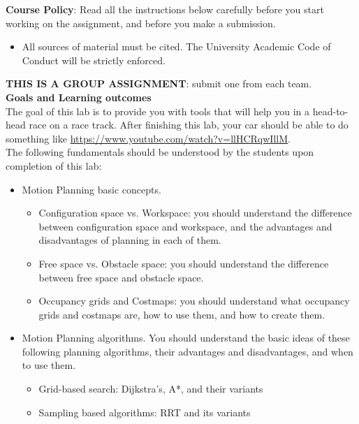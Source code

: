 \documentclass[letter]{article}
\begin{document}
\textbf{Course Policy}: Read all the instructions below carefully before you start working on the assignment, and before you make a submission.
\begin{itemize}
    \item All sources of material must be cited. The University Academic Code of Conduct
will be strictly enforced.
\end{itemize}
\textbf{THIS IS A GROUP ASSIGNMENT}: submit one from each team.\\

\textbf{Goals and Learning outcomes}\\
The goal of this lab is to provide you with tools that will help you in a head-to-head race on a race track. After finishing this lab, your car should be able to do something like \href{https://www.youtube.com/watch?v=llHCRqwIllM}{https://www.youtube.com/watch?v=llHCRqwIllM}.\\
The following fundamentals should be understood by the students upon completion of this lab:
\begin{itemize}
    \item Motion Planning basic concepts.
    \begin{itemize}
        \item Configuration space vs. Workspace: you should understand the difference between configuration space and workspace, and the advantages and disadvantages of planning in each of them.
        \item Free space vs. Obstacle space: you should understand the difference between free space and obstacle space.
        \item Occupancy grids and Costmaps: you should understand what occupancy grids and costmaps are, how to use them, and how to create them.
    \end{itemize}
    
    \item Motion Planning algorithms. You should understand the basic ideas of these following planning algorithms, their advantages and disadvantages, and when to use them.
    \begin{itemize}
        \item Grid-based search: Dijkstra's, A*, and their variants
        \item Sampling based algorithms: RRT and its variants
    \end{itemize}

\end{itemize}
\newpage
\end{document}
